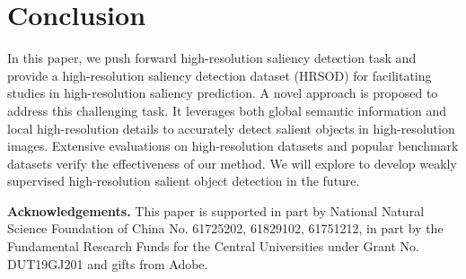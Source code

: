 \documentclass[10pt,twocolumn,letterpaper]{article}
\begin{document}
\section{Conclusion}
In this paper, we push forward high-resolution saliency detection task and provide a high-resolution saliency detection dataset (HRSOD) for facilitating studies in high-resolution saliency prediction. A novel approach is proposed to address this challenging task. It leverages both global semantic information and local high-resolution details to accurately detect salient objects in high-resolution images. Extensive evaluations on high-resolution datasets and popular benchmark datasets verify the effectiveness of our method. We will explore to develop weakly supervised high-resolution salient object detection in the future.


\noindent\textbf{Acknowledgements.} This paper is supported in part by National Natural Science Foundation of China No. 61725202, 61829102, 61751212, in part by the Fundamental Research Funds for the Central Universities under Grant No. DUT19GJ201 and gifts from Adobe.

{\small


}
\end{document}
